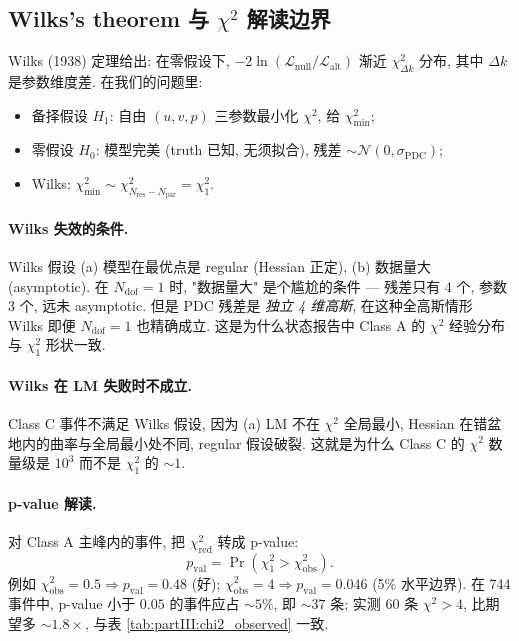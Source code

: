 \subsection{Wilks's theorem 与 $\chi^2$ 解读边界}
\label{sec:partIII:chi2:wilks}

Wilks (1938) 定理给出: 在零假设下, $-2 \ln (\mathcal{L}_{\mathrm{null}} / \mathcal{L}_{\mathrm{alt}})$ 渐近 $\chi^2_{\Delta k}$ 分布, 其中 $\Delta k$ 是参数维度差. 在我们的问题里:
\begin{itemize}[nosep]
  \item 备择假设 $H_1$: 自由 $(u, v, p)$ 三参数最小化 $\chi^2$, 给 $\chi^2_{\min}$;
  \item 零假设 $H_0$: 模型完美 (truth 已知, 无须拟合), 残差 $\sim \mathcal{N}(0, \sigma_{\mathrm{PDC}})$;
  \item Wilks: $\chi^2_{\min} \sim \chi^2_{N_{\mathrm{res}} - N_{\mathrm{par}}} = \chi^2_1$.
\end{itemize}

\paragraph{Wilks 失效的条件.}
Wilks 假设 (a) 模型在最优点是 regular (Hessian 正定), (b) 数据量大 (asymptotic). 在 $N_{\mathrm{dof}} = 1$ 时, "数据量大" 是个尴尬的条件 — 残差只有 4 个, 参数 3 个, 远未 asymptotic. 但是 PDC 残差是 \emph{独立 4 维高斯}, 在这种全高斯情形 Wilks 即便 $N_{\mathrm{dof}} = 1$ 也精确成立. 这是为什么状态报告中 Class A 的 $\chi^2$ 经验分布与 $\chi^2_1$ 形状一致.

\paragraph{Wilks 在 LM 失败时不成立.}
Class C 事件不满足 Wilks 假设, 因为 (a) LM 不在 $\chi^2$ 全局最小, Hessian 在错盆地内的曲率与全局最小处不同, regular 假设破裂. 这就是为什么 Class C 的 $\chi^2$ 数量级是 $10^3$ 而不是 $\chi^2_1$ 的 $\sim 1$.

\paragraph{p-value 解读.}
对 Class A 主峰内的事件, 把 $\chi^2_{\mathrm{red}}$ 转成 p-value:
\[
  p_{\mathrm{val}} = \Pr(\chi^2_1 > \chi^2_{\mathrm{obs}}).
\]
例如 $\chi^2_{\mathrm{obs}} = 0.5 \Rightarrow p_{\mathrm{val}} = 0.48$ (好); $\chi^2_{\mathrm{obs}} = 4 \Rightarrow p_{\mathrm{val}} = 0.046$ (5\% 水平边界). 在 744 事件中, p-value 小于 $0.05$ 的事件应占 $\sim 5\%$, 即 $\sim 37$ 条; 实测 60 条 $\chi^2 > 4$, 比期望多 $\sim 1.8\times$, 与表 \ref{tab:partIII:chi2_observed} 一致.

